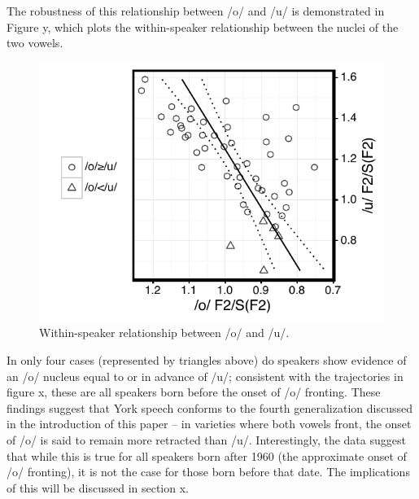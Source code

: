 \documentclass[12pt]{article}
\begin{document}
The robustness of this relationship between /o/ and /u/ is demonstrated in Figure y, which plots the within-speaker relationship between the nuclei of the two vowels.

\begin{figure}
\centering
\includegraphics{owuwcorrelation.pdf}
\caption{Within-speaker relationship between /o/ and /u/.}
\end{figure}

In only four cases (represented by triangles above) do speakers show evidence of an /o/ nucleus equal to or in advance of /u/; consistent with the trajectories in figure x, these are all speakers born before the onset of /o/ fronting. These findings suggest that York speech conforms to the fourth generalization discussed in the introduction of this paper -- in varieties where both vowels front, the onset of /o/ is said to remain more retracted than /u/. Interestingly, the data suggest that while this is true for all speakers born after 1960 (the approximate onset of /o/ fronting), it is not the case for those born before that date. The implications of this will be discussed in section x.
\end{document}
